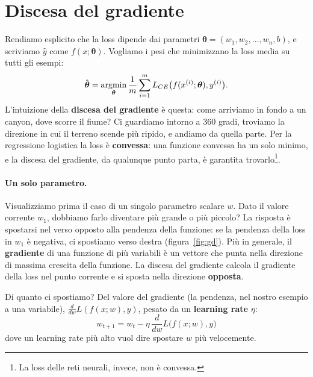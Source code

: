 \section{Discesa del gradiente}
Rendiamo esplicito che la loss dipende dai parametri $\boldsymbol{\theta} = (w_1, w_2, \dots, w_n, b)$, e scriviamo $\hat{y}$ come $f(x; \boldsymbol{\theta})$. Vogliamo i pesi che minimizzano la loss media su tutti gli esempi:
\begin{equation}
\hat{\boldsymbol{\theta}} = \operatorname*{argmin}_{\boldsymbol{\theta}} \frac{1}{m} \sum_{i=1}^{m} L_{CE}\big(f(x^{(i)}; \boldsymbol{\theta}), y^{(i)}\big).
\end{equation}
L'intuizione della \textbf{discesa del gradiente} è questa: come arriviamo in fondo a un canyon, dove scorre il fiume? Ci guardiamo intorno a 360 gradi, troviamo la direzione in cui il terreno scende più ripido, e andiamo da quella parte. Per la regressione logistica la loss è \textbf{convessa}: una funzione convessa ha un solo minimo, e la discesa del gradiente, da qualunque punto parta, è garantita trovarlo\footnote{La loss delle reti neurali, invece, non è convessa.}.

\paragraph{Un solo parametro.} Visualizziamo prima il caso di un singolo parametro scalare $w$. Dato il valore corrente $w_1$, dobbiamo farlo diventare più grande o più piccolo? La risposta è spostarsi nel verso opposto alla pendenza della funzione: se la pendenza della loss in $w_1$ è negativa, ci spostiamo verso destra (figura~\ref{fig:gd}). Più in generale, il \textbf{gradiente} di una funzione di più variabili è un vettore che punta nella direzione di massima crescita della funzione. La discesa del gradiente calcola il gradiente della loss nel punto corrente e si sposta nella direzione \textbf{opposta}.

Di quanto ci spostiamo? Del valore del gradiente (la pendenza, nel nostro esempio a una variabile), $\frac{d}{dw} L(f(x; w), y)$, pesato da un \textbf{learning rate} $\eta$:
\begin{equation}
w_{t+1} = w_t - \eta\, \frac{d}{dw} L\big(f(x; w), y\big)
\end{equation}
dove un learning rate più alto vuol dire spostare $w$ più velocemente.

